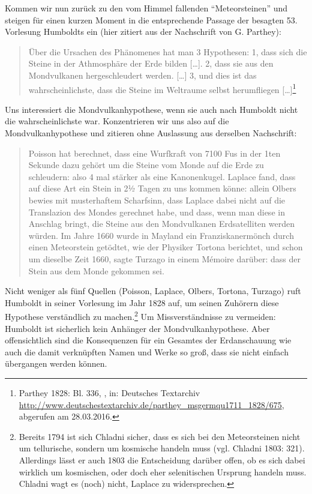 Kommen wir nun zurück zu den vom Himmel fallenden
\enquote{Meteorsteinen} und steigen für einen kurzen Moment in die
entsprechende Passage der besagten 53. Vorlesung Humboldts ein (hier
zitiert aus der Nachschrift von G. Parthey):

\begin{quote}
Über die Ursachen des Phänomenes hat man 3 Hypothesen: 1, dass sich die
Steine in der Athmosphäre der Erde bilden {[}\ldots{}{]}. 2, dass sie
aus den Mondvulkanen hergeschleudert werden. {[}\ldots{}{]} 3, und dies
ist das wahrscheinlichste, dass die Steine im Weltraume selbst
herumfliegen {[}\ldots{}{]}\footnote{Parthey 1828: Bl. 336, , in:
  Deutsches Textarchiv
  \url{http://www.deutschestextarchiv.de/parthey_msgermqu1711_1828/675},
  abgerufen am 28.03.2016.}
\end{quote}

Uns interessiert die Mondvulkanhypothese, wenn sie auch nach Humboldt
nicht die wahrscheinlichste war. Konzentrieren wir uns also auf die
Mondvulkanhypothese und zitieren ohne Auslassung aus derselben
Nachschrift:

\begin{quote}
Poisson hat berechnet, dass eine Wurfkraft von 7100 Fus in der 1ten
Sekunde dazu gehört um die Steine vom Monde auf die Erde zu schleudern:
also 4 mal stärker als eine Kanonenkugel. Laplace fand, dass auf diese
Art ein Stein in 2½ Tagen zu uns kommen könne: allein Olbers bewies mit
musterhaftem Scharfsinn, dass Laplace dabei nicht auf die Translazion
des Mondes gerechnet habe, und dass, wenn man diese in Anschlag bringt,
die Steine aus den Mondvulkanen Erdsatelliten werden würden. Im Jahre
1660 wurde in Mayland ein Franziskanermönch durch einen Meteorstein
getödtet, wie der Physiker Tortona berichtet, und schon um dieselbe Zeit
1660, sagte Turzago in einem Mémoire darüber: dass der Stein aus dem
Monde gekommen sei.
\end{quote}

Nicht weniger als fünf Quellen (Poisson, Laplace, Olbers, Tortona,
Turzago) ruft Humboldt in seiner Vorlesung im Jahr 1828 auf, um seinen
Zuhörern diese Hypothese verständlich zu machen.\footnote{Bereits 1794
  ist sich Chladni sicher, dass es sich bei den Meteorsteinen nicht um
  tellurische, sondern um kosmische handeln muss (vgl. Chladni 1803:
  321). Allerdings lässt er auch 1803 die Entscheidung darüber offen, ob
  es sich dabei wirklich um kosmischen, oder doch eher selenitischen
  Ursprung handeln muss. Chladni wagt es (noch) nicht, Laplace zu
  widersprechen.} Um Missverständnisse zu vermeiden: Humboldt ist
sicherlich kein Anhänger der Mondvulkanhypothese. Aber offensicht\-lich
sind die Konsequenzen für ein Gesamtes der Erdanschauung wie auch die
damit verknüpften Namen und Werke so groß, dass sie nicht einfach
übergangen werden können.

